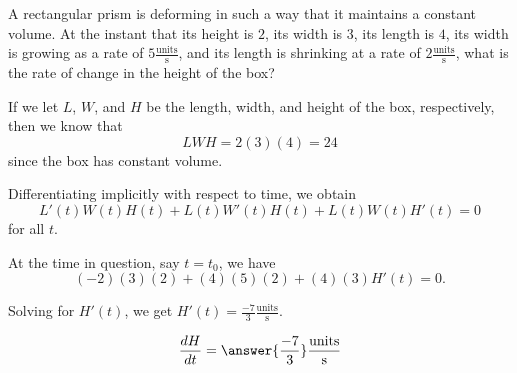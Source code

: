 \documentclass{ximera}
\author{Steven Gubkin}
\begin{document}
\begin{exercise}

A rectangular prism is deforming in such a way that it maintains a
constant volume.  At the instant that its height is $2$, its width is
$3$, its length is $4$, its width is growing as a rate of $5
\frac{\textrm{units}}{\textrm{s}}$, and its length is shrinking at a
rate of $2 \frac{\textrm{units}}{\textrm{s}}$, what is the rate of
change in the height of the box?

\begin{hint}
If we let $L$, $W$, and $H$ be the length, width, and height of the
box, respectively, then we know that
\[
LWH = 2(3)(4) = 24
\]
since the box has constant volume.
\end{hint}

\begin{hint}	
  Differentiating implicitly with respect to time, we obtain
\[
L'(t)W(t)H(t)+L(t)W'(t)H(t)+L(t)W(t)H'(t) = 0
\]
for all $t$.
\end{hint}

\begin{hint}
  At the time in question, say $t = t_0$, we have
\[
(-2)(3)(2)+(4)(5)(2)+(4)(3)H'(t) = 0.
\]
\end{hint}

\begin{hint}	
  Solving for $H'(t)$, we get $H'(t) = \frac{-7}{3}\frac{\textrm{units}}{\textrm{s}}.$
\end{hint}

\begin{prompt}
  \[
  \dd[H]{t} = \answer{\frac{-7}{3}}\frac{\textrm{units}}{\textrm{s}}
  \]
\end{prompt}

\end{exercise}
\end{document}
